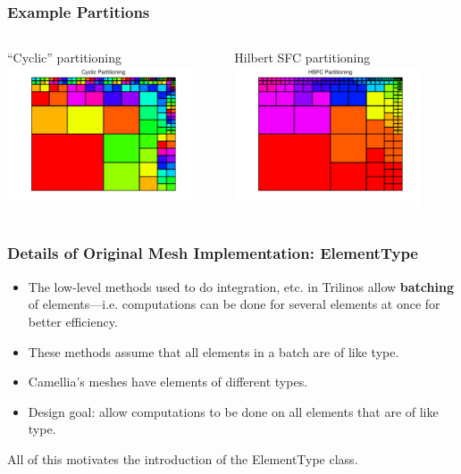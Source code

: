 \documentclass[mathserif]{beamer}
\begin{document}
\begin{frame}
\frametitle{Example Partitions}
\begin{columns}[c]
\begin{column}{5.5cm}
\begin{block}{``Cyclic'' partitioning}
\includegraphics[width=5.5cm]{../figs/cyclic.pdf}
\end{block}
\end{column}
\begin{column}{5.5cm}
\begin{block}{Hilbert SFC partitioning}
\includegraphics[width=5.5cm]{../figs/hsfc.pdf}
\end{block}
\end{column}
\end{columns}
\end{frame}

\begin{frame}
\frametitle{Details of Original Mesh Implementation: ElementType}
\begin{itemize}
\item The low-level methods used to do integration, etc. in Trilinos allow {\bf batching} of elements---i.e. computations can be done for several elements at once for better efficiency.
\item These methods assume that all elements in a batch are of like type.
\item Camellia's meshes have elements of different types.
\item Design goal: allow computations to be done on all elements that are of like type.
\end{itemize}

All of this motivates the introduction of the ElementType class.
\end{frame}
\end{document}
